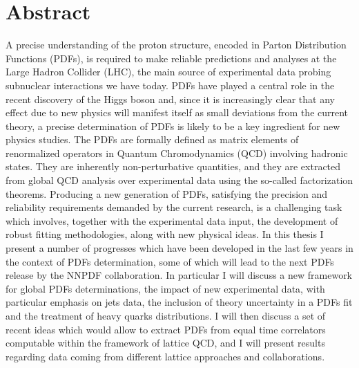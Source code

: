 \chapter*{Abstract}
A precise understanding of the proton structure, encoded in Parton Distribution Functions (PDFs), is required 
to make reliable predictions and analyses at the Large Hadron Collider (LHC), 
the main source of experimental data probing subnuclear interactions we have today.
PDFs have played a central role in the recent 
discovery of the Higgs boson and, since it is increasingly clear that any effect due to new physics 
will manifest itself as small deviations from the current theory, 
a precise determination of PDFs is likely to be a key ingredient 
for new physics studies.
%
The PDFs are formally defined as matrix elements of renormalized operators in Quantum Chromodynamics (QCD) involving hadronic states.
They are inherently non-perturbative quantities, and they are extracted from global QCD analysis over
experimental data using the so-called factorization theorems. 
Producing a new generation of PDFs, satisfying the precision and reliability requirements demanded by the current research,
is a challenging task which involves, together with the experimental data input, the development of robust
fitting methodologies, along with new physical ideas. 
%
In this thesis I present a number of progresses which have been developed in the last few years in the context of 
PDFs determination, some of which will lead to the next PDFs release by the NNPDF collaboration. 
In particular I will discuss a new framework for global PDFs determinations, the impact of new experimental data,
with particular emphasis on jets data, the inclusion of theory uncertainty in a PDFs fit 
and the treatment of heavy quarks distributions.
%
I will then discuss a set of recent ideas which would allow to extract PDFs from equal time correlators computable 
within the framework of lattice QCD, and I will present results regarding data coming from different 
lattice approaches and collaborations.

